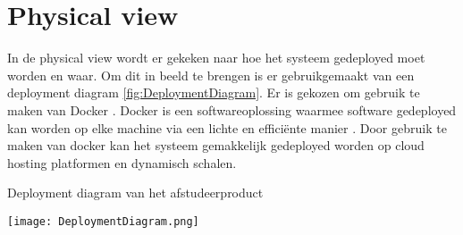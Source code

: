 \section{Physical view}
In de physical view wordt er gekeken naar hoe het systeem gedeployed moet worden en waar.
Om dit in beeld te brengen is er gebruikgemaakt van een deployment diagram \ref{fig:DeploymentDiagram}.
Er is gekozen om gebruik te maken van Docker \Parencite{Docker}.
Docker is een softwareoplossing waarmee software gedeployed kan worden op elke machine via een lichte en efficiënte manier \Parencite{Docker}.
Door gebruik te maken van docker kan het systeem gemakkelijk gedeployed worden op cloud hosting platformen en dynamisch schalen.

\whitespace
\begin{graphic}
    \captionsetup{type=figure}
    \caption{Deployment diagram van het afstudeerproduct}
    \texttt{[image: DeploymentDiagram.png]}
    \label{fig:DeploymentDiagram}
\end{graphic}
